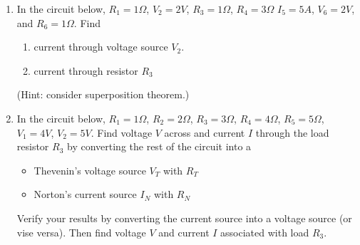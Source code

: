 \begin{enumerate}
\begin{enumerate}


\item In the circuit below, $R_1=1\Omega$, $V_2=2V$, $R_3=1\Omega$, $R_4=3\Omega$
$I_5=5A$, $V_6=2V$, and $R_6=1\Omega$. Find
\begin{enumerate}
\item current through voltage source $V_2$. 
\item current through resistor $R_3$
\end{enumerate}
(Hint: consider superposition theorem.)





\item In the circuit below, 
  $R_1=1\Omega$, $R_2=2\Omega$, $R_3=3\Omega$, $R_4=4\Omega$, $R_5=5\Omega$, 
  $V_1=4V$, $V_2=5V$. Find voltage $V$ across and current $I$ through the
  load resistor $R_3$ by converting the rest of the circuit into a
\begin{itemize}
  \item Thevenin's voltage source $V_T$ with $R_T$
  \item Norton's current source $I_N$ with $R_N$
\end{itemize}
Verify your results by converting the current source into a voltage source
(or vise versa). Then find voltage $V$ and current $I$ associated with load
$R_3$.


\end{enumerate}
\end{enumerate}
